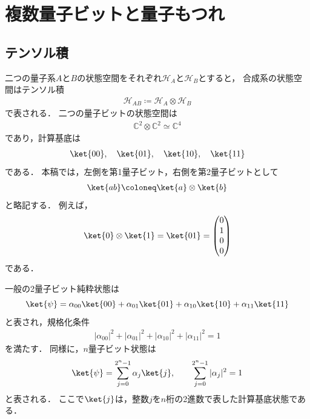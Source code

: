 \section{複数量子ビットと量子もつれ}
\label{sec:multiple-qubits}

\subsection{テンソル積}
\label{subsec:tensor-product}

二つの量子系$A$と$B$の状態空間をそれぞれ$\mathcal{H}_A$と$\mathcal{H}_B$とすると，
合成系の状態空間はテンソル積
\begin{align*}
  \mathcal{H}_{AB}
  \coloneq
  \mathcal{H}_A\otimes\mathcal{H}_B
\end{align*}
で表される．
二つの量子ビットの状態空間は
\begin{align*}
  \mathbb{C}^2\otimes\mathbb{C}^2
  \simeq
  \mathbb{C}^4
\end{align*}
であり，計算基底は
\begin{align*}
  \ket{00},\quad
  \ket{01},\quad
  \ket{10},\quad
  \ket{11}
\end{align*}
である．
本稿では，左側を第1量子ビット，右側を第2量子ビットとして
\begin{align*}
  \ket{ab}
  \coloneq
  \ket{a}\otimes\ket{b}
\end{align*}
と略記する．
例えば，
\begin{align*}
  \ket{0}\otimes\ket{1}
  =
  \ket{01}
  =
  \begin{pmatrix}
    0 \\
    1 \\
    0 \\
    0
  \end{pmatrix}
\end{align*}
である．

一般の2量子ビット純粋状態は
\begin{equation}
  \ket{\psi}
  =
  \alpha_{00}\ket{00}
  +\alpha_{01}\ket{01}
  +\alpha_{10}\ket{10}
  +\alpha_{11}\ket{11}
  \label{eq:two-qubit-state}
\end{equation}
と表され，規格化条件
\begin{align*}
  |\alpha_{00}|^2
  +|\alpha_{01}|^2
  +|\alpha_{10}|^2
  +|\alpha_{11}|^2
  =1
\end{align*}
を満たす．
同様に，$n$量子ビット状態は
\begin{equation}
  \ket{\psi}
  =
  \sum_{j=0}^{2^n-1}\alpha_j\ket{j},
  \qquad
  \sum_{j=0}^{2^n-1}|\alpha_j|^2=1
  \label{eq:n-qubit-state}
\end{equation}
と表される．
ここで$\ket{j}$は，整数$j$を$n$桁の2進数で表した計算基底状態である．

